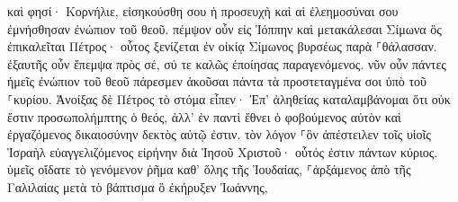 \documentclass{openreader}
\begin{document}
καὶ φησί· Κορνήλιε, εἰσηκούσθη σου ἡ προσευχὴ καὶ αἱ ἐλεημοσύναι σου ἐμνήσθησαν ἐνώπιον τοῦ θεοῦ. 
πέμψον οὖν εἰς Ἰόππην καὶ μετακάλεσαι Σίμωνα ὃς ἐπικαλεῖται Πέτρος· οὗτος ξενίζεται ἐν οἰκίᾳ Σίμωνος βυρσέως παρὰ ⸀θάλασσαν. 
ἐξαυτῆς οὖν ἔπεμψα πρὸς σέ, σύ τε καλῶς ἐποίησας παραγενόμενος. νῦν οὖν πάντες ἡμεῖς ἐνώπιον τοῦ θεοῦ πάρεσμεν ἀκοῦσαι πάντα τὰ προστεταγμένα σοι ὑπὸ τοῦ ⸀κυρίου. 
Ἀνοίξας δὲ Πέτρος τὸ στόμα εἶπεν· Ἐπ’ ἀληθείας καταλαμβάνομαι ὅτι οὐκ ἔστιν προσωπολήμπτης ὁ θεός, 
ἀλλ’ ἐν παντὶ ἔθνει ὁ φοβούμενος αὐτὸν καὶ ἐργαζόμενος δικαιοσύνην δεκτὸς αὐτῷ ἐστιν. 
τὸν λόγον ⸀ὃν ἀπέστειλεν τοῖς υἱοῖς Ἰσραὴλ εὐαγγελιζόμενος εἰρήνην διὰ Ἰησοῦ Χριστοῦ· οὗτός ἐστιν πάντων κύριος. 
ὑμεῖς οἴδατε τὸ γενόμενον ῥῆμα καθ’ ὅλης τῆς Ἰουδαίας, ⸀ἀρξάμενος ἀπὸ τῆς Γαλιλαίας μετὰ τὸ βάπτισμα ὃ ἐκήρυξεν Ἰωάννης, 
\end{document}
